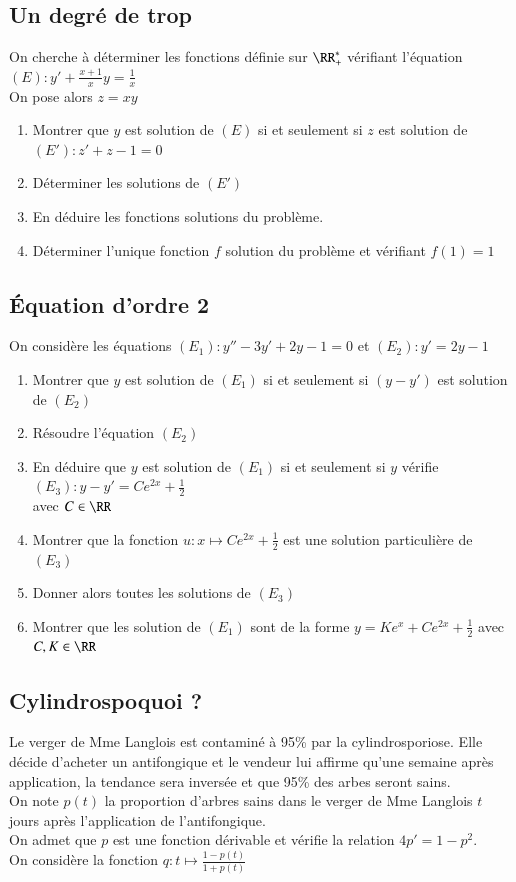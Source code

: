 \documentclass[oneside,12pt]{article}          %
\begin{document}
\subsection{Un degré de trop}
On cherche à déterminer les fonctions définie sur $\RR_+^*$ vérifiant l'équation $(E):y'+\frac{x+1}{x}y=\frac{1}{x}$\\
On pose alors $z=xy$
\begin{enumerate}
	\item Montrer que $y$ est solution de $(E)$ si et seulement si $z$ est solution de $(E'):z'+z-1=0$
	\item Déterminer les solutions de $(E')$
	\item En déduire les fonctions solutions du problème.
	\item Déterminer l'unique fonction $f$ solution du problème et vérifiant $f(1)=1$
\end{enumerate}



\subsection{Équation d'ordre 2}
On considère les équations $(E_1):y''-3y'+2y-1=0$ et $(E_2):y'=2y-1$
\begin{enumerate}
	\item Montrer que $y$ est solution de $(E_1)$ si et seulement si $(y-y')$ est solution de $(E_2)$
	\item Résoudre l'équation $(E_2)$
	\item En déduire que $y$ est solution de $(E_1)$ si et seulement si $y$ vérifie $(E_3):y-y'=Ce^{2x}+\frac{1}{2}$ \\avec $C\in\RR$
	\item Montrer que la fonction $u:x\mapsto Ce^{2x}+\frac{1}{2}$ est une solution particulière de $(E_3)$
	\item Donner alors toutes les solutions de $(E_3)$
	\item Montrer que les solution de $(E_1)$ sont de la forme $y=Ke^x+Ce^{2x}+\frac{1}{2}$ \quad avec $C,K\in\RR$
\end{enumerate}




\subsection{Cylindrospoquoi ?}
Le verger de Mme Langlois est contaminé à 95\% par la cylindrosporiose. Elle décide d'acheter un antifongique et le vendeur lui affirme qu'une semaine après application, la tendance sera inversée et que 95\% des arbes seront sains.\\[5pt]
On note $p(t)$ la proportion d'arbres sains dans le verger de Mme Langlois $t$ jours après l'application de l'antifongique.\\[5pt]
On admet que $p$ est une fonction dérivable et vérifie la relation $4p'=1-p^2$.\\[5pt]
On considère la fonction $q:t\mapsto \frac{1-p(t)}{1+p(t)}$
\end{document}
